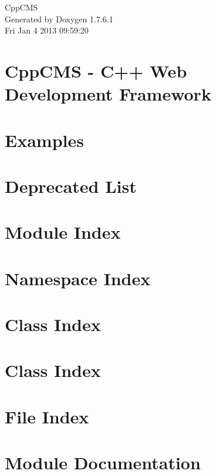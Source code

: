 \documentclass[a4paper]{book}
\begin{document}
\begin{titlepage}
\vspace*{7cm}
\begin{center}
{\Large \-Cpp\-C\-M\-S }\\
\vspace*{1cm}
{\large \-Generated by Doxygen 1.7.6.1}\\
\vspace*{0.5cm}
{\small Fri Jan 4 2013 09:59:20}\\
\end{center}
\end{titlepage}
\clearemptydoublepage
{}
\tableofcontents
\clearemptydoublepage
{}
\chapter{\-Cpp\-C\-M\-S -\/ \-C++ \-Web \-Development \-Framework}
\label{index}
\chapter{\-Examples}
\label{examples_page}

\chapter{\-Deprecated \-List}
\label{deprecated}

\chapter{\-Module \-Index}

\chapter{\-Namespace \-Index}

\chapter{\-Class \-Index}

\chapter{\-Class \-Index}

\chapter{\-File \-Index}

\chapter{\-Module \-Documentation}







\end{document}

